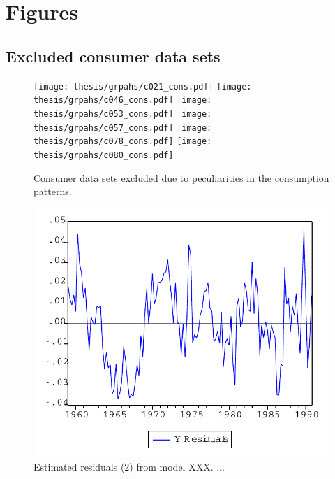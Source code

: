 
\section{Figures}\label{App:Figures}

\subsection{Excluded consumer data sets}\label{App:Figures;Excluded}

\begin{figure}[ht]
    \begin{center}
        \texttt{[image: thesis/grpahs/c021\_cons.pdf]}
        \texttt{[image: thesis/grpahs/c046\_cons.pdf]}
        \texttt{[image: thesis/grpahs/c053\_cons.pdf]}
        \texttt{[image: thesis/grpahs/c057\_cons.pdf]}
        \texttt{[image: thesis/grpahs/c078\_cons.pdf]}
        \texttt{[image: thesis/grpahs/c080\_cons.pdf]}
        \caption[Consumer data sets excluded due to peculiarities in the consumption patterns]{Consumer data sets excluded due to peculiarities in the consumption patterns. \quantnet}
        \label{Fig:Resids2}
    \end{center}
\end{figure}



\begin{figure}[ht]
    \begin{center}
        \includegraphics[scale=0.5,angle=0]{thesis/figures/graph.pdf}
        \caption{Estimated residuals (2) from model XXX. ...}
        \label{Fig:Resids2}
    \end{center}
\end{figure}
